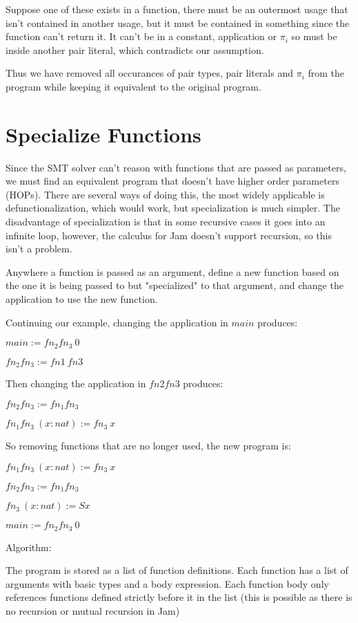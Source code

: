 \documentclass[12pt,a4paper,titlepage]{article}
\begin{document}
    Suppose one of these exists in a function, there must be an outermost usage that isn't contained in another
    usage, but it must be contained in something since the function can't return it. It can't be in a constant,
    application or $\pi_i$ so must be inside another pair literal, which contradicts our assumption.

    Thus we have removed all occurances of pair types, pair literals and $\pi_i$ from the program while keeping
    it equivalent to the original program.

    \section{Specialize Functions}
    Since the SMT solver can't reason with functions that are passed as parameters, we must find an equivalent
    program that doesn't have higher order parameters (HOPs).
    There are several ways of doing this, the most widely applicable is defunctionalization, which would work,
    but specialization is much simpler.
    The disadvantage of specialization is that in some recursive cases it goes into an infinite loop, however,
    the calculus for Jam doesn't support recursion, so this isn't a problem.

    Anywhere a function is passed as an argument, define a new function based on the one it is being passed
    to but "specialized" to that argument, and change the application to use the new function.

    Continuing our example, changing the application in $main$ produces:

    $main := fn_2 fn_3\ 0$

    $fn_2 fn_3 := fn1\ fn3$

    Then changing the application in $fn2fn3$ produces:

    $fn_2 fn_3 := fn_1 fn_3$

    $fn_1 fn_3\ (x: nat) := fn_3\ x$

    So removing functions that are no longer used, the new program is:

    $fn_1 fn_3\ (x: nat) := fn_3\ x$

    $fn_2 fn_3 := fn_1 fn_3$

    $fn_3\ (x: nat) := S x$

    $main := fn_2 fn_3\ 0$

    Algorithm:

    The program is stored as a list of function definitions.
    Each function has a list of arguments with basic types and a body expression.
    Each function body only references functions defined strictly before it in the list (this is
    possible as there is no recursion or mutual recursion in Jam)
\end{document}
